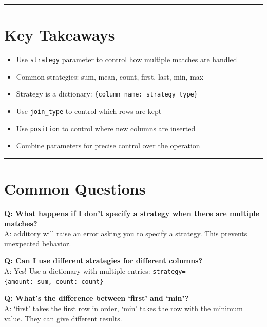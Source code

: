 \documentclass[
  letterpaper,
]{scrbook}
\providecommand{\tightlist}{%
  \setlength{\itemsep}{0pt}\setlength{\parskip}{0pt}}
\begin{document}
\begin{center}\rule{0.5\linewidth}{0.5pt}\end{center}

\section{Key Takeaways}\label{key-takeaways-3}

\begin{itemize}
\tightlist
\item
  Use \texttt{strategy} parameter to control how multiple matches are
  handled
\item
  Common strategies: sum, mean, count, first, last, min, max
\item
  Strategy is a dictionary: \texttt{\{column\_name:\ strategy\_type\}}
\item
  Use \texttt{join\_type} to control which rows are kept
\item
  Use \texttt{position} to control where new columns are inserted
\item
  Combine parameters for precise control over the operation
\end{itemize}

\begin{center}\rule{0.5\linewidth}{0.5pt}\end{center}

\section{Common Questions}\label{common-questions-3}

\textbf{Q: What happens if I don't specify a strategy when there are
multiple matches?}\\
A: additory will raise an error asking you to specify a strategy. This
prevents unexpected behavior.

\textbf{Q: Can I use different strategies for different columns?}\\
A: Yes! Use a dictionary with multiple entries:
\texttt{strategy=\{\textquotesingle{}amount\textquotesingle{}:\ \textquotesingle{}sum\textquotesingle{},\ \textquotesingle{}count\textquotesingle{}:\ \textquotesingle{}count\textquotesingle{}\}}

\textbf{Q: What's the difference between `first' and `min'?}\\
A: `first' takes the first row in order, `min' takes the row with the
minimum value. They can give different results.
\end{document}
